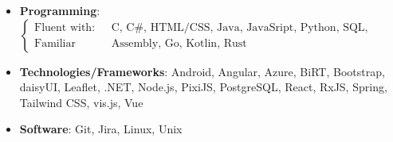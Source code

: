 \documentclass{article}
\begin{document}
\vspace*{\fill}


\begin{itemize}

	\item \textbf{Programming}: \(\begin{cases} \text{Fluent with:}   & \text{C,
	              C\#, HTML/CSS, Java, JavaSript, Python, SQL, Typescript}
              \\
              \text{Familiar with:} & \text{Assembly, Go, Kotlin, Rust}
	      \end{cases}\)
	\item \textbf{Technologies/Frameworks}: Android, Angular, Azure, BiRT,
	      Bootstrap, daisyUI, Leaflet, .NET, Node.js, PixiJS, PostgreSQL, React,
	      RxJS, Spring, Tailwind CSS, vis.js, Vue
	\item \textbf{Software}: Git, Jira, Linux, Unix
\end{itemize}
\end{document}
